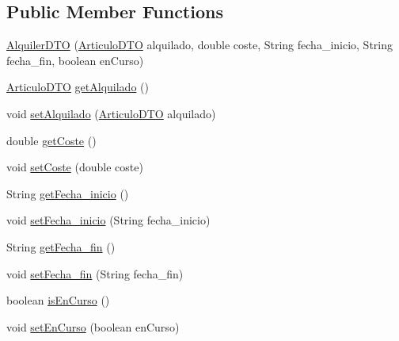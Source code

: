 \subsection*{Public Member Functions}
\begin{DoxyCompactItemize}
\item 
\mbox{\hyperlink{classes_1_1deusto_1_1server_1_1dto_1_1_alquiler_d_t_o_aa488aa0095e5e2cabcbbe16c9f6db2e9}{Alquiler\+D\+TO}} (\mbox{\hyperlink{classes_1_1deusto_1_1server_1_1dto_1_1_articulo_d_t_o}{Articulo\+D\+TO}} alquilado, double coste, String fecha\+\_\+inicio, String fecha\+\_\+fin, boolean en\+Curso)
\item 
\mbox{\hyperlink{classes_1_1deusto_1_1server_1_1dto_1_1_articulo_d_t_o}{Articulo\+D\+TO}} \mbox{\hyperlink{classes_1_1deusto_1_1server_1_1dto_1_1_alquiler_d_t_o_ab872b982cf52cbf63fdc40e1faca2e55}{get\+Alquilado}} ()
\item 
void \mbox{\hyperlink{classes_1_1deusto_1_1server_1_1dto_1_1_alquiler_d_t_o_aa417dcd16babce06eb5f38bccba2d3bf}{set\+Alquilado}} (\mbox{\hyperlink{classes_1_1deusto_1_1server_1_1dto_1_1_articulo_d_t_o}{Articulo\+D\+TO}} alquilado)
\item 
double \mbox{\hyperlink{classes_1_1deusto_1_1server_1_1dto_1_1_alquiler_d_t_o_a70276af6a407faf0756e228c5481a696}{get\+Coste}} ()
\item 
void \mbox{\hyperlink{classes_1_1deusto_1_1server_1_1dto_1_1_alquiler_d_t_o_ad0f90f08697500e6c2bd27a88ea2b8d4}{set\+Coste}} (double coste)
\item 
String \mbox{\hyperlink{classes_1_1deusto_1_1server_1_1dto_1_1_alquiler_d_t_o_a9884b7e1e6e863114e6b1fb46f11bd76}{get\+Fecha\+\_\+inicio}} ()
\item 
void \mbox{\hyperlink{classes_1_1deusto_1_1server_1_1dto_1_1_alquiler_d_t_o_a46fda8afca27005c664eee147ef7a4f8}{set\+Fecha\+\_\+inicio}} (String fecha\+\_\+inicio)
\item 
String \mbox{\hyperlink{classes_1_1deusto_1_1server_1_1dto_1_1_alquiler_d_t_o_a673ffee73348ad5df5dde0bd8294f614}{get\+Fecha\+\_\+fin}} ()
\item 
void \mbox{\hyperlink{classes_1_1deusto_1_1server_1_1dto_1_1_alquiler_d_t_o_a525694fa1e603fe8b5460d36eee1abb9}{set\+Fecha\+\_\+fin}} (String fecha\+\_\+fin)
\item 
boolean \mbox{\hyperlink{classes_1_1deusto_1_1server_1_1dto_1_1_alquiler_d_t_o_ad6e596042f9fb361495a4f5475c77554}{is\+En\+Curso}} ()
\item 
void \mbox{\hyperlink{classes_1_1deusto_1_1server_1_1dto_1_1_alquiler_d_t_o_ab37af5191dd929a17514bd387b6e7ce1}{set\+En\+Curso}} (boolean en\+Curso)
\end{DoxyCompactItemize}


